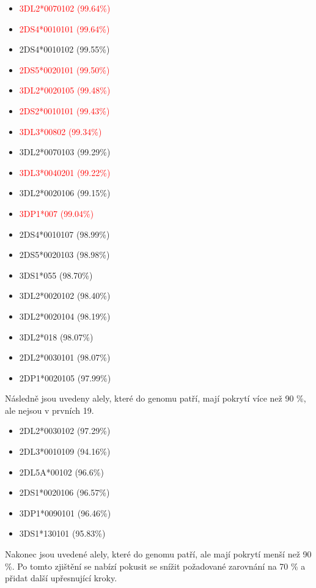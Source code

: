 \documentclass[czech,DP]{thesiskiv}
\numberwithin{equation}{section}
\begin{document}
\begin{multicols}{2}
\begin{itemize}
	\itemsep0em
	\item \textcolor{red}{3DL2*0070102 (99.64\%) }
	\item \textcolor{red}{2DS4*0010101 (99.64\%) }
	\item 2DS4*0010102 (99.55\%)
	\item \textcolor{red}{2DS5*0020101 (99.50\%) }
	\item \textcolor{red}{3DL2*0020105 (99.48\%) }
	\item \textcolor{red}{2DS2*0010101 (99.43\%) }
	\item \textcolor{red}{3DL3*00802 (99.34\%) }
	\item 3DL2*0070103 (99.29\%) 
	\item \textcolor{red}{3DL3*0040201 (99.22\%) }
	\item 3DL2*0020106 (99.15\%)
	\item \textcolor{red}{3DP1*007 (99.04\%) }
	\item 2DS4*0010107 (98.99\%)
	\item 2DS5*0020103 (98.98\%)
	\item 3DS1*055 (98.70\%)
	\item 3DL2*0020102 (98.40\%)
	\item 3DL2*0020104 (98.19\%)
	\item 3DL2*018 (98.07\%)
	\item 2DL2*0030101 (98.07\%)
	\item 2DP1*0020105 (97.99\%)
\end{itemize}
\end{multicols}

\noindent
Následně jsou uvedeny alely, které do genomu patří, mají pokrytí více než 90 \%, ale nejsou v prvních 19.
\begin{multicols}{2}
\begin{itemize}
	\itemsep0em
	\item 2DL2*0030102 (97.29\%)
	\item 2DL3*0010109 (94.16\%)
	\item 2DL5A*00102 (96.6\%)
	\item 2DS1*0020106 (96.57\%)
	\item 3DP1*0090101 (96.46\%)
	\item 3DS1*130101 (95.83\%)
\end{itemize}
\end{multicols}


\noindent
Nakonec jsou uvedené alely, které do genomu patří, ale mají pokrytí menší než 90 \%. Po tomto zjištění se nabízí pokusit se snížit požadované zarovnání na 70 \% a přidat další upřesnující kroky.
\end{document}
